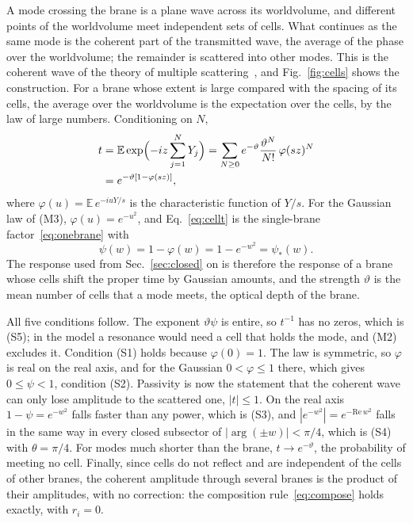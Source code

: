 \documentclass[a4paper,11pt]{article}
\newcommand{\bE}{\mathbb{E}}
\begin{document}
A mode crossing the brane is a plane wave across its worldvolume, and different points of the worldvolume meet independent sets of cells. What continues as the same mode is the coherent part of the transmitted wave, the average of the phase over the worldvolume; the remainder is scattered into other modes. This is the coherent wave of the theory of multiple scattering~\cite{Foldy1945,Lax1951}, and Fig.~\ref{fig:cells} shows the construction. For a brane whose extent is large compared with the spacing of its cells, the average over the worldvolume is the expectation over the cells, by the law of large numbers. Conditioning on $N$,
\begin{align}
t&=\bE\exp\Bigl(-iz\sum_{j=1}^NY_j\Bigr)=\sum_{N\ge0}e^{-\vartheta}\frac{\vartheta^N}{N!}\,\varphi(sz)^N\nonumber\\
&=e^{-\vartheta[1-\varphi(sz)]},\label{eq:cellt}
\end{align}
where $\varphi(u)=\bE\,e^{-iuY/s}$ is the characteristic function of $Y/s$. For the Gaussian law of (M3), $\varphi(u)=e^{-u^2}$, and Eq.~\eqref{eq:cellt} is the single-brane factor~\eqref{eq:onebrane} with
\begin{equation}
\label{eq:cellpsi}
\psi(w)=1-\varphi(w)=1-e^{-w^2}=\psi_*(w).
\end{equation}
The response used from Sec.~\ref{sec:closed} on is therefore the response of a brane whose cells shift the proper time by Gaussian amounts, and the strength $\vartheta$ is the mean number of cells that a mode meets, the optical depth of the brane.

All five conditions follow. The exponent $\vartheta\psi$ is entire, so $t^{-1}$ has no zeros, which is (S5); in the model a resonance would need a cell that holds the mode, and (M2) excludes it. Condition (S1) holds because $\varphi(0)=1$. The law is symmetric, so $\varphi$ is real on the real axis, and for the Gaussian $0<\varphi\le1$ there, which gives $0\le\psi<1$, condition (S2). Passivity is now the statement that the coherent wave can only lose amplitude to the scattered one, $|t|\le1$. On the real axis $1-\psi=e^{-w^2}$ falls faster than any power, which is (S3), and $|e^{-w^2}|=e^{-\mathrm{Re}\,w^2}$ falls in the same way in every closed subsector of $|\arg(\pm w)|<\pi/4$, which is (S4) with $\theta=\pi/4$. For modes much shorter than the brane, $t\to e^{-\vartheta}$, the probability of meeting no cell. Finally, since cells do not reflect and are independent of the cells of other branes, the coherent amplitude through several branes is the product of their amplitudes, with no correction: the composition rule~\eqref{eq:compose} holds exactly, with $r_i=0$.
\end{document}
